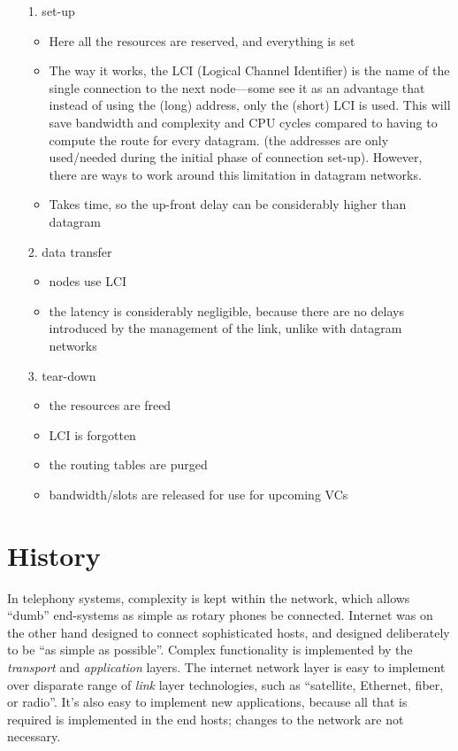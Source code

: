 \documentclass[10pt]{report}
\begin{document}
\begin{itemize}
\item[1.] set-up
    \begin{itemize}
    \item Here all the resources are reserved, and everything is set
    \item The way it works, the LCI (Logical Channel Identifier) is the name of the single connection to the next node---some see it as an advantage that instead of using the (long) address, only the (short) LCI is used.  This will save bandwidth and complexity and CPU cycles compared to having to compute the route for every datagram. \cite[p158]{russell} (the addresses are only used/needed during the initial phase of connection set-up).  However, there are ways to work around this limitation in datagram networks.
    \item Takes time, so the up-front delay can be considerably higher than datagram
    \end{itemize}
\item[2.] data transfer
    \begin{itemize}
    \item nodes use LCI
    \item the latency is considerably negligible, because there are no delays introduced by the management of the link, unlike with datagram networks
    \end{itemize}
\item[3.] tear-down
    \begin{itemize}
        \item the resources are freed
	\item LCI is forgotten
	\item the routing tables are purged
	\item bandwidth/slots are released for use for upcoming VCs
    \end{itemize}
\end{itemize}


\section{History}

In telephony systems, complexity is kept within the network, which allows
``dumb'' end-systems as simple as rotary phones be connected.  Internet was on
the other hand designed to connect sophisticated hosts, and designed
deliberately to be ``as simple as possible''.  Complex functionality is
implemented by the {\em transport} and {\em application} layers.  The internet
network layer is easy to implement over disparate range of {\em link} layer
technologies, such as ``satellite, Ethernet, fiber, or radio''.  It's also easy
to implement new applications, because all that is required is implemented in
the end hosts; changes to the network are not necessary.
\cite[pp349--351]{kurose}
\end{document}
